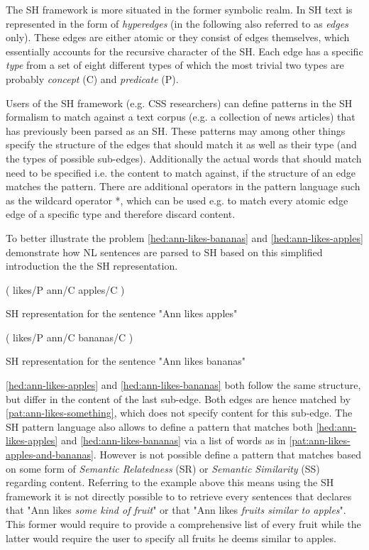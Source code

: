 \documentclass[11pt]{scrreprt}
\let\cite\parencite  %
\begin{document}
The SH framework is more situated in the former symbolic realm. In SH text is represented in the form of \textit{hyperedges} (in the following also referred to as \textit{edges} only). These edges are either atomic or they consist of edges themselves, which essentially accounts for the recursive character of the SH. Each edge has a specific \textit{type} from a set of eight different types of which the most trivial two types are probably \textit{concept} (\textsf{C}) and \textit{predicate} (\textsf{P}). 

Users of the SH framework (e.g. CSS researchers) can define patterns in the SH formalism to match against a text corpus (e.g. a collection of news articles) that has previously been parsed as an SH. These patterns may among other things specify the structure of the edges that should match it as well as their type (and the types of possible sub-edges). Additionally the actual words that should match need to be specified i.e. the content to match against, if the structure of an edge matches the pattern. 
There are additional operators in the pattern language such as the wildcard operator \textsf{*}, which can be used e.g. to match every atomic edge edge of a specific type and therefore discard content.

To better illustrate the problem \cref{hed:ann-likes-bananas} and \cref{hed:ann-likes-apples} demonstrate how NL sentences are parsed to SH based on this simplified introduction the the SH representation.

\begin{hedge}
  \normalfont\sffamily
  \centering
  ( likes/P ann/C apples/C ) 
  \caption{SH representation for the sentence "Ann likes apples"}
  \label{hed:ann-likes-apples}
\end{hedge}

\begin{hedge}
  \normalfont\sffamily
  \centering
  ( likes/P ann/C bananas/C ) 
  \caption{SH representation for the sentence "Ann likes bananas"}
  \label{hed:ann-likes-bananas}
\end{hedge}

\cref{hed:ann-likes-apples} and \cref{hed:ann-likes-bananas} both follow the same structure, but differ in the content of the last sub-edge. Both edges are hence matched by \cref{pat:ann-likes-something}, which does not specify content for this sub-edge.
The SH pattern language also allows to define a pattern that matches both \cref{hed:ann-likes-apples} and \cref{hed:ann-likes-bananas} via a list of words as in \cref{pat:ann-likes-apples-and-bananas}. However is not possible define a pattern that matches based on some form of \textit{Semantic Relatedness} (SR) or \textit{Semantic Similarity} (SS) \cite{harispeSemanticSimilarityNatural2015} regarding content.
Referring to the example above this means using the SH framework it is not directly possible to to retrieve every sentences that declares that "Ann likes \textit{some kind of fruit}" or that "Ann likes \textit{fruits similar to apples}". This former would require to provide a comprehensive list of every fruit while the latter would require the user to specify all fruits he deems similar to apples.
\end{document}
